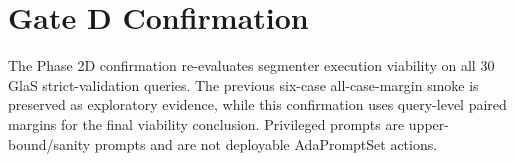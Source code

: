 \section{Gate D Confirmation}
The Phase 2D confirmation re-evaluates segmenter execution viability on all 30 GlaS strict-validation queries.
The previous six-case all-case-margin smoke is preserved as exploratory evidence, while this confirmation uses query-level paired margins for the final viability conclusion.
Privileged prompts are upper-bound/sanity prompts and are not deployable AdaPromptSet actions.



